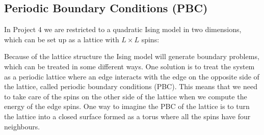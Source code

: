 \documentclass[norsk,a4paper,12pt]{article}
\begin{document}
\subsection{Periodic Boundary Conditions (PBC)}
In Project 4 we are restricted to a quadratic Ising model in two dimensions, which can be set up as a lattice with $L\times L$ spins: 
\begin{center}
\end{center}
Because of the lattice structure the Ising model will generate boundary problems, which can be treated in some different ways. One solution is to treat the system as a periodic lattice where an edge interacts with the edge on the opposite side of the lattice, called periodic boundary conditions (PBC). This means that we need to take care of the spins on the other side of the lattice when we compute the energy of the edge spins. One way to imagine the PBC of the lattice is to turn the lattice into a closed surface formed as a torus where all the spins have four neighbours. 
 
\end{document}
